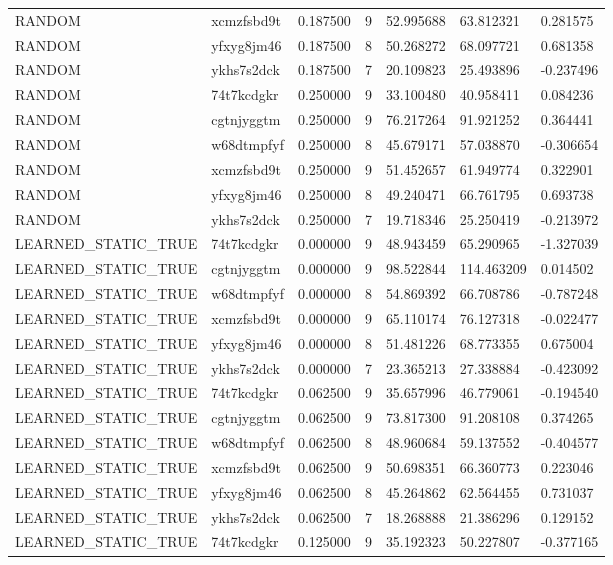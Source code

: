 \begin{tabular}{lllllll}
RANDOM & xcmzfsbd9t & 0.187500 & 9 & 52.995688 & 63.812321 & 0.281575 \\
RANDOM & yfxyg8jm46 & 0.187500 & 8 & 50.268272 & 68.097721 & 0.681358 \\
RANDOM & ykhs7s2dck & 0.187500 & 7 & 20.109823 & 25.493896 & -0.237496 \\
RANDOM & 74t7kcdgkr & 0.250000 & 9 & 33.100480 & 40.958411 & 0.084236 \\
RANDOM & cgtnjyggtm & 0.250000 & 9 & 76.217264 & 91.921252 & 0.364441 \\
RANDOM & w68dtmpfyf & 0.250000 & 8 & 45.679171 & 57.038870 & -0.306654 \\
RANDOM & xcmzfsbd9t & 0.250000 & 9 & 51.452657 & 61.949774 & 0.322901 \\
RANDOM & yfxyg8jm46 & 0.250000 & 8 & 49.240471 & 66.761795 & 0.693738 \\
RANDOM & ykhs7s2dck & 0.250000 & 7 & 19.718346 & 25.250419 & -0.213972 \\
LEARNED\_STATIC\_TRUE & 74t7kcdgkr & 0.000000 & 9 & 48.943459 & 65.290965 & -1.327039 \\
LEARNED\_STATIC\_TRUE & cgtnjyggtm & 0.000000 & 9 & 98.522844 & 114.463209 & 0.014502 \\
LEARNED\_STATIC\_TRUE & w68dtmpfyf & 0.000000 & 8 & 54.869392 & 66.708786 & -0.787248 \\
LEARNED\_STATIC\_TRUE & xcmzfsbd9t & 0.000000 & 9 & 65.110174 & 76.127318 & -0.022477 \\
LEARNED\_STATIC\_TRUE & yfxyg8jm46 & 0.000000 & 8 & 51.481226 & 68.773355 & 0.675004 \\
LEARNED\_STATIC\_TRUE & ykhs7s2dck & 0.000000 & 7 & 23.365213 & 27.338884 & -0.423092 \\
LEARNED\_STATIC\_TRUE & 74t7kcdgkr & 0.062500 & 9 & 35.657996 & 46.779061 & -0.194540 \\
LEARNED\_STATIC\_TRUE & cgtnjyggtm & 0.062500 & 9 & 73.817300 & 91.208108 & 0.374265 \\
LEARNED\_STATIC\_TRUE & w68dtmpfyf & 0.062500 & 8 & 48.960684 & 59.137552 & -0.404577 \\
LEARNED\_STATIC\_TRUE & xcmzfsbd9t & 0.062500 & 9 & 50.698351 & 66.360773 & 0.223046 \\
LEARNED\_STATIC\_TRUE & yfxyg8jm46 & 0.062500 & 8 & 45.264862 & 62.564455 & 0.731037 \\
LEARNED\_STATIC\_TRUE & ykhs7s2dck & 0.062500 & 7 & 18.268888 & 21.386296 & 0.129152 \\
LEARNED\_STATIC\_TRUE & 74t7kcdgkr & 0.125000 & 9 & 35.192323 & 50.227807 & -0.377165 \\

\end{tabular}
